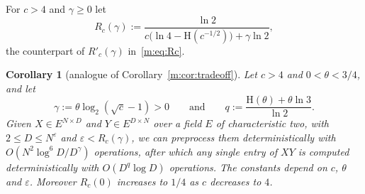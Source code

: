 \documentclass[11pt]{article}
\newtheorem{corollary}[theorem]{Corollary}
\theoremstyle{definition}
\theoremstyle{remark}
\newcommand{\Hh}{\mathrm{H}}
\begin{document}
For $c>4$ and $\gamma\ge0$ let
\begin{equation}\label{t:eq:Rc}
R_c(\gamma):=\frac{\ln2}{c\big(\ln4-\Hh(c^{-1/2})\big)+\gamma\ln2},
\end{equation}
the counterpart of $R'_c(\gamma)$ in~\eqref{m:eq:Rc}.

\begin{corollary}[analogue of Corollary~\ref{m:cor:tradeoff}]\label{t:cor:tradeoff}
Let $c>4$ and $0<\theta<3/4$, and let
\[
\gamma:=\theta\log_2(\sqrt c-1)>0\qquad\text{and}\qquad q:=\frac{\Hh(\theta)+\theta\ln3}{\ln2}.
\]
Given $X\in E^{N\times D}$ and $Y\in E^{D\times N}$ over a field $E$ of characteristic two, with $2\le D\le N^\varepsilon$ and $\varepsilon<R_c(\gamma)$, we can preprocess them deterministically with $O(N^2\log^6D/D^\gamma)$ operations, after which any single entry of $XY$ is computed deterministically with $O(D^q\log D)$ operations. The constants depend on $c$, $\theta$ and $\varepsilon$. Moreover $R_c(0)$ increases to $1/4$ as $c$ decreases to $4$.
\end{corollary}
\end{document}
